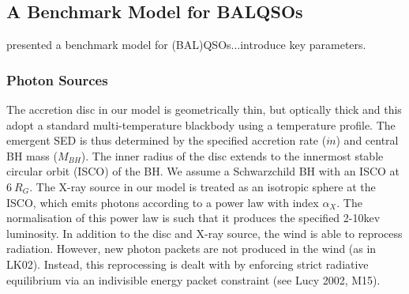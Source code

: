 \documentclass[useAMS,usenatbib]{mn2e_x}
\begin{document}
\subsection{A Benchmark Model for BALQSOs}

\cite{higginbottom2013} presented a benchmark model for
(BAL)QSOs...introduce key parameters. 

\subsubsection{Photon Sources}


The accretion disc in our model is geometrically thin, but optically thick
and this adopt a standard multi-temperature blackbody
using a \cite{shakurasunyaev1973} temperature profile. 
The emergent SED is thus determined by the specified accretion rate ($\dot{m}$)
and central BH mass ($M_{BH}$).
The inner radius of the disc extends to the innermost 
stable circular orbit (ISCO) of the BH. 
We assume a Schwarzchild BH with an ISCO at $6~R_G$.
The X-ray source in our model is treated as an isotropic sphere at the ISCO,
which emits photons according to a power law with index $\alpha_X$.
The normalisation of this power law is such that it produces the specified 
2-10kev luminosity.
In addition to the disc and X-ray source, 
the wind is able to reprocess radiation. However, new 
photon packets are not produced in the wind (as in LK02). 
Instead, this reprocessing is dealt with by enforcing strict
radiative equilibrium via an indivisible energy packet
constraint (see Lucy 2002, M15).








\end{document}
